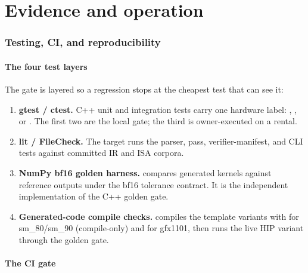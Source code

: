 \clearpage
\floraon
{}
\part{Evidence and operation}
\thispagestyle{empty}
\clearpage
\floraoff

\section{Testing, CI, and reproducibility}
\label{sec:repro}

\subsection{The four test layers}
\label{sec:test-layers}

The gate is layered so a regression stops at the cheapest test that can see
it:
\begin{enumerate}
  \item \textbf{gtest / ctest.} C++ unit and integration tests carry one
        hardware label: , , or
        . The first two are the local gate; the third is
        owner-executed on a rental.
  \item \textbf{lit / FileCheck.} The  target runs the
        parser, pass, verifier-manifest, and CLI tests against committed IR and
        ISA corpora.
  \item \textbf{NumPy bf16 golden harness.}  compares
        generated kernels against reference outputs under the bf16 tolerance
        contract. It is the independent implementation of the C++ golden gate.
  \item \textbf{Generated-code compile checks.} 
        compiles the template variants with  for sm\_80/sm\_90
        (compile-only) and  for gfx1101, then runs the live HIP
        variant through the golden gate.
\end{enumerate}

\subsection{The CI gate}
\label{sec:ci}

